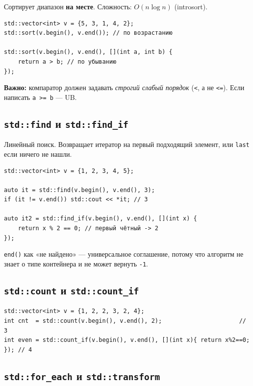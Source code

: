 \documentclass[a4paper,12pt]{article}
\begin{document}
Сортирует диапазон \textbf{на месте}. Сложность: $O(n \log n)$ (introsort).

\begin{lstlisting}
std::vector<int> v = {5, 3, 1, 4, 2};
std::sort(v.begin(), v.end()); // по возрастанию

std::sort(v.begin(), v.end(), [](int a, int b) {
    return a > b; // по убыванию
});
\end{lstlisting}

\textbf{Важно:} компаратор должен задавать \textit{строгий слабый порядок}
(\texttt{<}, а не \texttt{<=}). Если написать \texttt{a >= b} --- UB.

\subsection{\texttt{std::find} и \texttt{std::find\_if}}

Линейный поиск. Возвращает итератор на первый подходящий элемент,
или \texttt{last} если ничего не нашли.

\begin{lstlisting}
std::vector<int> v = {1, 2, 3, 4, 5};

auto it = std::find(v.begin(), v.end(), 3);
if (it != v.end()) std::cout << *it; // 3

auto it2 = std::find_if(v.begin(), v.end(), [](int x) {
    return x % 2 == 0; // первый чётный -> 2
});
\end{lstlisting}

\texttt{end()} как «не найдено» --- универсальное соглашение, потому что
алгоритм не знает о типе контейнера и не может вернуть \texttt{-1}.

\subsection{\texttt{std::count} и \texttt{std::count\_if}}

\begin{lstlisting}
std::vector<int> v = {1, 2, 2, 3, 2, 4};
int cnt  = std::count(v.begin(), v.end(), 2);                      // 3
int even = std::count_if(v.begin(), v.end(), [](int x){ return x%2==0; }); // 4
\end{lstlisting}

\subsection{\texttt{std::for\_each} и \texttt{std::transform}}
\end{document}
